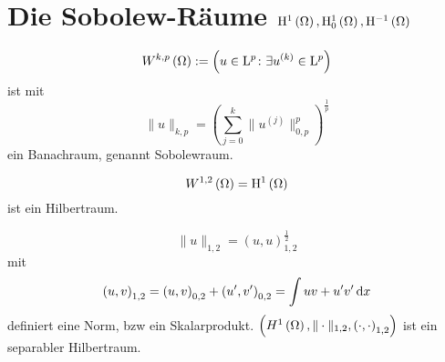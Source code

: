 \section{Die Sobolew-Räume $\mathrm{H}^{1}\left(\Omega\right), \mathrm{H}^{1}_{0}\left(\Omega\right), \mathrm{H}^{-1}\left(\Omega\right)$}
\begin{definition}
	\begin{equation*}
		W^{k,p}\left(\Omega\right):=\left(u\in\mathrm{L}^{p}\colon\exists u^{\left(k\right)}\in\mathrm{L}^{p}\right)
	\end{equation*}
	ist mit
	\begin{equation*}
		\|u\|_{k,p} = \left(\sum_{j=0}^{k}\|u^{\left(j\right)}\|_{0,p}^{p}\right)^{\frac{1}{p}}
	\end{equation*}
	ein Banachraum, genannt Sobolewraum.
\end{definition}
\begin{definition}
	\begin{equation*}
		W^{1,2}\left(\Omega\right) = \mathrm{H}^{1}\left(\Omega\right)
	\end{equation*}
	ist ein Hilbertraum.
\end{definition}

\begin{lemma}[Satz]
	\begin{equation*}
		\|u\|_{1,2} = \left(u,u\right)_{1,2}^{\frac{1}{2}}
	\end{equation*}
	mit
	\begin{equation*}
		\left(u,v\right)_{1,2} = \left(u,v\right)_{0,2} + \left(u^{\prime},v^{\prime}\right)_{0,2} = \int uv+u^{\prime}v^{\prime}\,\mathrm{d} x
	\end{equation*}
	definiert eine Norm, bzw ein Skalarprodukt. $\left(H^{1}\left(\Omega\right),\|\cdot\|_{1,2},\left(\cdot,\cdot\right)_{1,2}\right)$ ist ein separabler Hilbertraum.
\end{lemma}
